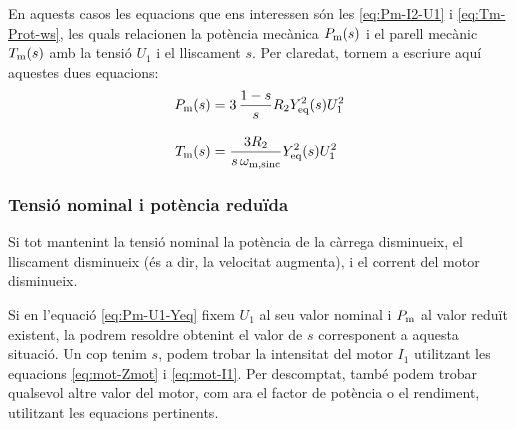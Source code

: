En aquests casos les equacions que ens interessen són les \eqref{eq:Pm-I2-U1} i \eqref{eq:Tm-Prot-ws}, les quals relacionen la potència mecànica $P_\mathrm{m}(s)$ i el parell mecànic $T_\mathrm{m}(s)$ amb la tensió $U_1$ i el lliscament $s$. Per claredat, tornem a escriure aquí aquestes dues equacions:
\begin{subequations}
	\begin{align}
	P_\mathrm{m}(s) &= 3 \,\frac{1-s}{s} R_2 Y_\mathrm{eq}^2(s) U_1^2\label{eq:Pm-U1-Yeq} \\[2ex]
	T_\mathrm{m}(s) &=\frac{3 R_2}{s\,\omega_\mathrm{m,sinc}} Y_\mathrm{eq}^2(s) U_1^2\label{eq:Tm-U1-Yeq}
	\end{align}
\end{subequations}

	
\subsubsection{Tensió nominal i potència reduïda}	

Si tot mantenint la tensió nominal la potència de la càrrega disminueix, el lliscament disminueix (és a dir, la velocitat augmenta), i el corrent del motor disminueix.
	
Si en l'equació \eqref{eq:Pm-U1-Yeq} fixem $U_1$ al seu valor nominal i  $P_\mathrm{m}$ al  valor reduït existent,  la podrem resoldre obtenint el valor de $s$ corresponent  a aquesta situació. Un cop tenim $s$, podem trobar la intensitat del motor $I_1$ utilitzant les equacions \eqref{eq:mot-Zmot} i \eqref{eq:mot-I1}. Per descomptat, també podem trobar qualsevol altre valor del motor, com  ara el factor de potència o el rendiment, utilitzant les equacions pertinents.


